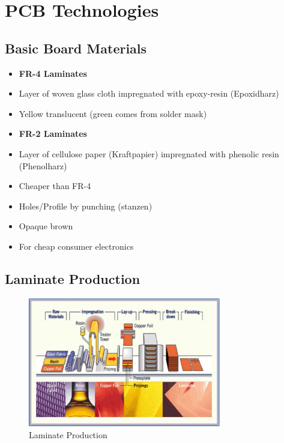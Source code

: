 \section{PCB Technologies}

	\subsection{Basic Board Materials}
		\begin{itemize}
			\setlength{\itemsep}{0pt}
			\item \textbf{FR-4 Laminates}
			\setlength{\itemsep}{-5pt}
			\item[] Layer of woven glass cloth impregnated with epoxy-resin (Epoxidharz)
			\item[] Yellow translucent (green comes from solder mask)
			\setlength{\itemsep}{0pt}
			\item \textbf{FR-2 Laminates}
			\setlength{\itemsep}{-5pt}
			\item[] Layer of cellulose paper (Kraftpapier) impregnated with phenolic resin (Phenolharz)
			\item[] Cheaper than FR-4
			\item[] Holes/Profile by punching (stanzen)
			\item[] Opaque brown 
			\item[] For cheap consumer electronics 
		\end{itemize}
		
	\subsection{Laminate Production}
		\begin{figure}[h]
			\centering
			\includegraphics[width=0.75\textwidth]{images/LaminateProduction.png}
			\caption{Laminate Production}
			\label{Fig:LaminateProduction}
		\end{figure}
			
